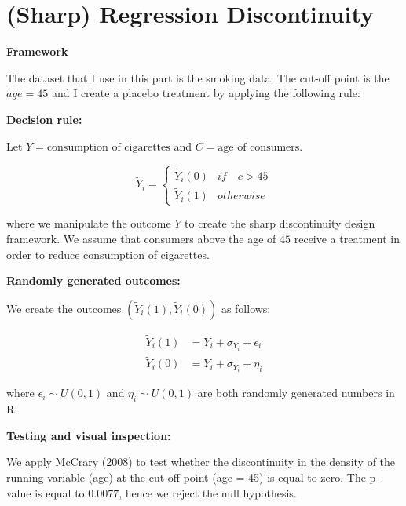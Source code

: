 \documentclass[a4paper]{article}
\title{}
\author{Problem Set IV -  Sharp Regression Discontinuity\\
	\small{\emph{Enrijeta Shino}}}
\begin{document}
	\maketitle



\section{ (Sharp) Regression Discontinuity}

\noindent \textbf{Framework}

\noindent The dataset that I use in this part is the smoking data. The cut-off point is the $age = 45$ and I create a placebo treatment by applying the following rule: 

\noindent \textbf{Decision rule:} 

\noindent Let $\tilde{Y} = \text{consumption of cigarettes}$ and $C = \text{age of consumers}$. 

\begin{equation} \tilde{Y}_i = 
\begin{cases}
	\tilde{Y}_i(0) & if \quad c > 45 \\
	\tilde{Y}_i(1) & otherwise
\end{cases}
\end{equation}

\noindent where we manipulate the outcome $Y$ to create the sharp discontinuity design framework. We assume that consumers above the age of $45$ receive a treatment in order to reduce consumption of cigarettes. 

\noindent\textbf{Randomly generated outcomes:}

\noindent We create the outcomes $(\tilde{Y}_i(1), \tilde{Y}_i(0))$ as follows: 

\begin{align}
\tilde{Y}_i(1)  &= Y_i + \sigma_{Y_i} + \epsilon_i \\
\tilde{Y}_i(0) &=  Y_i + \sigma_{Y_i} + \eta_i 
\end{align}

where $\epsilon_i \sim U(0,1)$ and $\eta_i \sim U(0,1)$ are both randomly generated numbers in R. 

\noindent\textbf{Testing and visual inspection:}

\noindent We apply McCrary (2008)  to test whether the discontinuity in the density of the running variable (age) at the cut-off point (age = 45) is equal to zero. The p-value is equal to $0.0077$, hence we reject the null hypothesis. 
\end{document}
